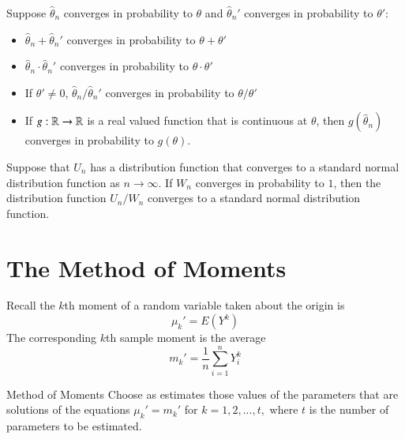 \documentclass[12pt, a4paper, twoside, openright, titlepage]{book}
\begin{document}
\begin{thm}{}{}
    Suppose $\hat{\theta}_n$ converges in probability to $\theta$ and $\hat{\theta}_n'$ converges in probability to $\theta'$: \begin{itemize}
        \item $\hat{\theta}_n + \hat{\theta}_n'$ converges in probability to $\theta+\theta'$
        \item $\hat{\theta}_n\cdot\hat{\theta}_n'$ converges in probability to $\theta\cdot\theta'$
        \item If $\theta'\neq 0$, $\hat{\theta}_n/\hat{\theta}_n'$ converges in probability to $\theta/\theta'$
        \item If $g:\mathbb R\rightarrow \mathbb R$ is a real valued function that is continuous at $\theta$, then $g(\hat{\theta}_n)$ converges in probability to $g(\theta)$.
    \end{itemize}
\end{thm}

\begin{thm}{}{}
    Suppose that $U_n$ has a distribution function that converges to a standard normal distribution function as $n\rightarrow \infty$. If $W_n$ converges in probability to $1$, then the distribution function $U_n/W_n$ converges to a standard normal distribution function.
\end{thm}

\section{The Method of Moments}


\begin{rec}{}{}
    Recall the $k$th moment of a random variable taken about the origin is \begin{equation*}
        \mu_k' = E(Y^k)
    \end{equation*}
    The corresponding $k$th sample moment is the average \begin{equation*}
        m_k' = \frac{1}{n}\sum_{i=1}^nY_i^k
    \end{equation*}
\end{rec}


\begin{proc}{Method of Moments}{}
    Choose as estimates those values of the parameters that are solutions of the equations $\mu_k' = m_k'$ for $k=1,2,...,t,$ where $t$ is the number of parameters to be estimated.
\end{proc}
\end{document}
